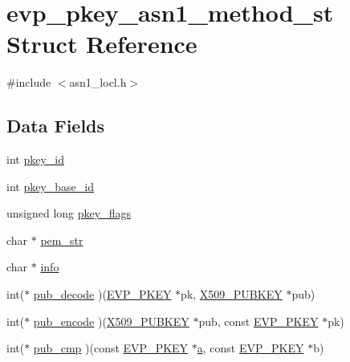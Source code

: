 \hypertarget{structevp__pkey__asn1__method__st}{}\section{evp\+\_\+pkey\+\_\+asn1\+\_\+method\+\_\+st Struct Reference}
\label{structevp__pkey__asn1__method__st}


{\ttfamily \#include $<$asn1\+\_\+locl.\+h$>$}

\subsection*{Data Fields}
\begin{DoxyCompactItemize}
\item 
int \hyperlink{structevp__pkey__asn1__method__st_a1021097b3af14d7ae24a3756def116d2}{pkey\+\_\+id}
\item 
int \hyperlink{structevp__pkey__asn1__method__st_aea38ea93ebe785c0db560b617daee72a}{pkey\+\_\+base\+\_\+id}
\item 
unsigned long \hyperlink{structevp__pkey__asn1__method__st_a307b7d4a21c2c8f905a80603cfc75093}{pkey\+\_\+flags}
\item 
char $\ast$ \hyperlink{structevp__pkey__asn1__method__st_aeb0c9b2b27fe6a9b06c0927172dd7ce7}{pem\+\_\+str}
\item 
char $\ast$ \hyperlink{structevp__pkey__asn1__method__st_a65627378647d3a125ae55432f3f569e2}{info}
\item 
int($\ast$ \hyperlink{structevp__pkey__asn1__method__st_abb9cc296e1842e3bf89fbd0c6443df91}{pub\+\_\+decode} )(\hyperlink{crypto_2ossl__typ_8h_a2fca4fef9e4c7a2a739b1ea04acb56ce}{E\+V\+P\+\_\+\+P\+K\+EY} $\ast$pk, \hyperlink{crypto_2ossl__typ_8h_a9183376ae13a86ca35c75edf5412b914}{X509\+\_\+\+P\+U\+B\+K\+EY} $\ast$pub)
\item 
int($\ast$ \hyperlink{structevp__pkey__asn1__method__st_afb3a83eaa71f6091257cd317119c2a84}{pub\+\_\+encode} )(\hyperlink{crypto_2ossl__typ_8h_a9183376ae13a86ca35c75edf5412b914}{X509\+\_\+\+P\+U\+B\+K\+EY} $\ast$pub, const \hyperlink{crypto_2ossl__typ_8h_a2fca4fef9e4c7a2a739b1ea04acb56ce}{E\+V\+P\+\_\+\+P\+K\+EY} $\ast$pk)
\item 
int($\ast$ \hyperlink{structevp__pkey__asn1__method__st_a3d5ce40ba3130bfa4903627a90674fd0}{pub\+\_\+cmp} )(const \hyperlink{crypto_2ossl__typ_8h_a2fca4fef9e4c7a2a739b1ea04acb56ce}{E\+V\+P\+\_\+\+P\+K\+EY} $\ast$\hyperlink{hpux_8cc_af3e37283d97a42ffc096d8958a745f32}{a}, const \hyperlink{crypto_2ossl__typ_8h_a2fca4fef9e4c7a2a739b1ea04acb56ce}{E\+V\+P\+\_\+\+P\+K\+EY} $\ast$b)

\end{DoxyCompactItemize}
